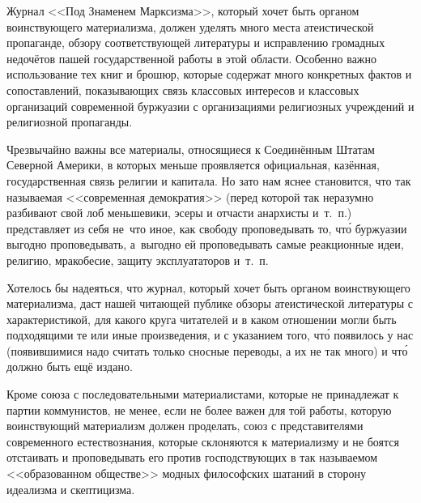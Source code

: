 Журнал <<Под Знаменем Марксизма>>, который хочет быть органом воинствующего
материализма, должен уделять много места атеистической пропаганде, обзору
соответствующей литературы и исправлению громадных недочётов пашей
государственной работы в этой области. Особенно важно использование тех
книг и брошюр, которые содержат много конкретных фактов и сопоставлений,
показывающих связь классовых интересов и классовых организаций современной
буржуазии с организациями религиозных учреждений и религиозной
пропаганды.

Чрезвычайно важны все материалы, относящиеся к Соединённым Штатам Северной
Америки, в которых меньше проявляется официальная, казённая,
государственная связь религии и капитала. Но зато нам яснее становится, что
так называемая <<современная демократия>> (перед которой так неразумно
разбивают свой лоб меньшевики, эсеры и отчасти анархисты и~т.~п.)
представляет из себя не~что иное, как свободу проповедывать то, чт\'{о}
буржуазии выгодно проповедывать, а~выгодно ей проповедывать самые
реакционные идеи, религию, мракобесие, защиту эксплуататоров и~т.~п.

Хотелось бы надеяться, что журнал, который хочет быть органом воинствующего
материализма, даст нашей читающей публике обзоры атеистической литературы с
характеристикой, для какого круга читателей и в каком отношении могли быть
подходящими те или иные произведения, и с указанием того, чт\'{о} появилось у
нас (появившимися надо считать только сносные переводы, а их не так много)
и чт\'{о} должно быть ещё издано.

\sectionline

Кроме союза с последовательными материалистами, которые не принадлежат к
партии коммунистов, не менее, если не более важен для той работы, которую
воинствующий материализм должен проделать, союз с представителями
современного естествознания, которые склоняются к материализму и не боятся
отстаивать и проповедывать его против господствующих в так называемом
<<образованном обществе>> модных философских шатаний в сторону идеализма и
скептицизма.

